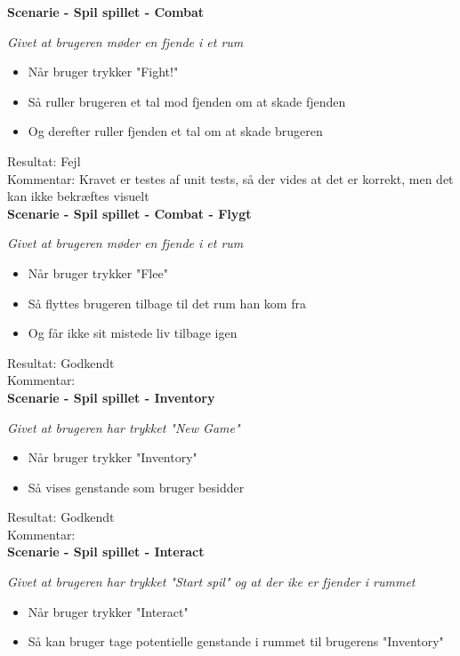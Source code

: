 \textbf{Scenarie - Spil spillet - Combat}

\textit{Givet at brugeren møder en fjende i et rum}

\begin{itemize}
  \item Når bruger trykker "Fight!"
  \item Så ruller brugeren et tal mod fjenden om at skade fjenden
  \item Og derefter ruller fjenden et tal om at skade brugeren
\end{itemize}

Resultat: Fejl\\
Kommentar: Kravet er testes af unit tests, så der vides at det er korrekt, men det kan ikke bekræftes visuelt\\

\textbf{Scenarie - Spil spillet - Combat - Flygt}

\textit{Givet at brugeren møder en fjende i et rum}

\begin{itemize}
  \item Når bruger trykker "Flee"
  \item Så flyttes brugeren tilbage til det rum han kom fra
  \item Og får ikke sit mistede liv tilbage igen
\end{itemize}

Resultat: Godkendt\\
Kommentar:\\

\textbf{Scenarie - Spil spillet - Inventory}

\textit{Givet at brugeren har trykket "New Game"}

\begin{itemize}
  \item Når bruger trykker "Inventory"
  \item Så vises genstande som bruger besidder
\end{itemize}

Resultat: Godkendt\\
Kommentar:\\

\textbf{Scenarie - Spil spillet - Interact}

\textit{Givet at brugeren har trykket "Start spil" og at der ike er fjender i rummet}

\begin{itemize}
  \item Når bruger trykker "Interact"
  \item Så kan bruger tage potentielle genstande i rummet til brugerens "Inventory"
\end{itemize}


